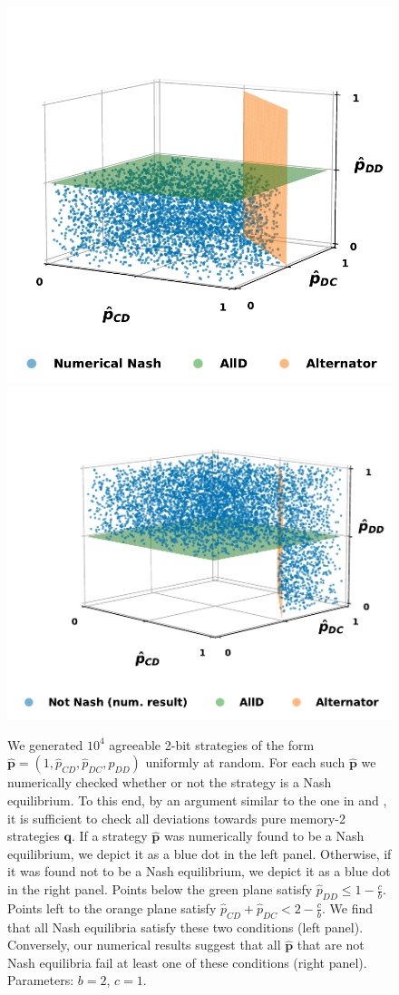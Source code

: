 \documentclass{article}
\theoremstyle{definition}
\begin{document}
\begin{figure}[t]
  \centering
  \includegraphics[width=.45\textwidth]{static/for_akin_no_proved_area.pdf}
  \includegraphics[width=.5\textwidth]{static/for_akin_non_nash.pdf}
  \caption{We generated $10^4$ agreeable 2-bit strategies of the form $\mathbf{\hat{p}}=(1,\hat{p}_{CD},\hat{p}_{DC},\hat{p}_{DD})$ uniformly at random. 
  For each such $\mathbf{\hat{p}}$ we numerically checked whether or not the strategy is a Nash equilibrium. 
  To this end, by an argument similar to the one in \citep{press:PNAS:2012} and  \citep{mcavoy:PRSA:2019}, it is sufficient to check all deviations towards pure memory-2 strategies $\mathbf{q}$.
  If a strategy $\mathbf{\hat{p}}$ was numerically found to be a Nash equilibrium, we depict it as a blue dot in the left panel.
  Otherwise, if it was found not to be a Nash equilibrium, we depict it as a blue dot in the right panel.  
  Points below the green plane satisfy $\hat{p}_{DD} \leq 1\!-\! \frac{c}{b}$. 
  Points left to the orange plane satisfy $\hat{p}_{CD} + \hat{p}_{DC} < 2-\frac{c}{b}$.
  We find that all Nash equilibria satisfy these two conditions (left panel). 
  Conversely, our numerical results suggest that all $\mathbf{\hat{p}}$ that are not Nash equilibria fail at least one of these conditions (right panel).
  Parameters: $b\!=\!2$, $c\!=\!1$.
  }
\end{figure}

~\\

\end{document}
